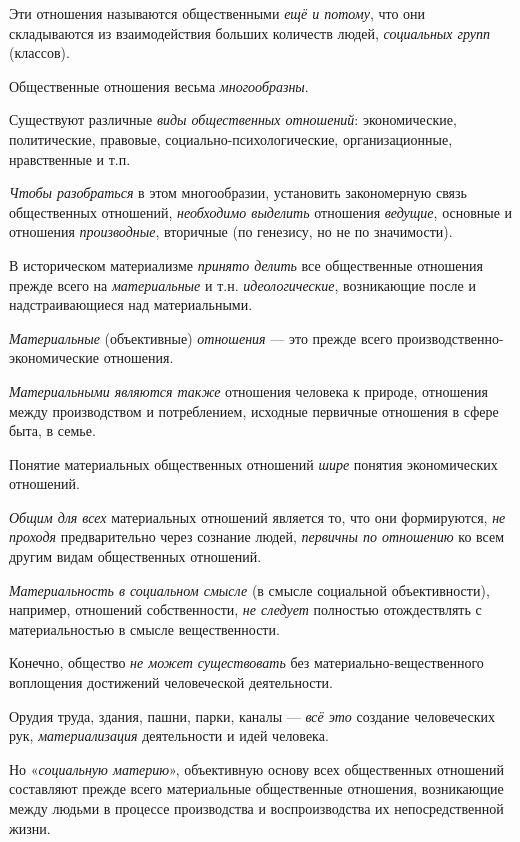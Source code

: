 \documentclass[a4paper,14pt,russian]{extreport}
\begin{document}
Эти отношения называются общественными \emph{ещё и потому}, что они складываются из взаимодействия больших количеств людей, \emph{социальных групп} (классов).

Общественные отношения весьма \emph{многообразны}.

Существуют различные \emph{виды общественных отношений}: экономические, политические, правовые, социально-психологические, организационные, нравственные и т.п.

\emph{Чтобы разобраться} в этом многообразии, установить закономерную связь общественных отношений, \emph{необходимо выделить} отношения \emph{ведущие}, основные и отношения \emph{производные}, вторичные (по генезису, но не по значимости).

В историческом материализме \emph{принято делить} все общественные отношения прежде всего на \emph{материальные} и т.н. \emph{идеологические}, возникающие после и надстраивающиеся над материальными.

\emph{Материальные} (объективные) \emph{отношения} --- это прежде всего производственно-экономические отношения.

\emph{Материальными являются также} отношения человека к природе, отношения между производством и потреблением, исходные первичные отношения в сфере быта, в семье.

Понятие материальных общественных отношений \emph{шире} понятия экономических отношений.

\emph{Общим для всех} материальных отношений является то, что они формируются, \emph{не проходя} предварительно через сознание людей, \emph{первичны по отношению} ко всем другим видам общественных отношений.

\emph{Материальность в социальном смысле} (в смысле социальной объективности), например, отношений собственности, \emph{не следует} полностью отождествлять с материальностью в смысле вещественности.

Конечно, общество \emph{не может существовать} без материально-вещественного воплощения достижений человеческой деятельности.

Орудия труда, здания, пашни, парки, каналы --- \emph{всё это} создание человеческих рук, \emph{материализация} деятельности и идей человека.

Но «\emph{социальную материю}», объективную основу всех общественных отношений составляют прежде всего материальные общественные отношения, возникающие между людьми в процессе производства и воспроизводства их непосредственной жизни.
\end{document}
